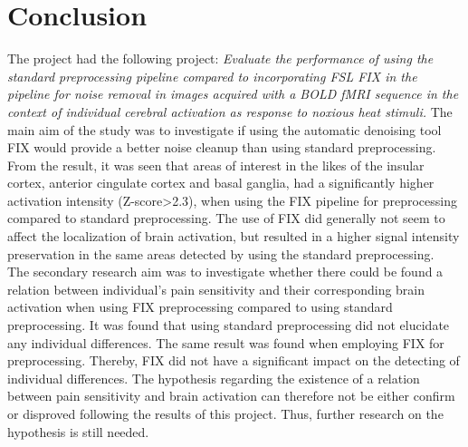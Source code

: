 \chapter{Conclusion}

The project had the following project: \textit{Evaluate the performance of using the standard preprocessing pipeline compared to incorporating FSL FIX in the pipeline for noise removal in images acquired with a BOLD fMRI sequence in the context of individual cerebral activation as response to noxious heat stimuli.} The main aim of the study was to investigate if using the automatic denoising tool FIX would provide a better noise cleanup than using standard preprocessing. From the result, it was seen that areas of interest in the likes of the insular cortex, anterior cingulate cortex and basal ganglia, had a significantly higher activation intensity (Z-score>2.3), when using the FIX pipeline for preprocessing compared to standard preprocessing. The use of FIX did generally not seem to affect the localization of brain activation, but resulted in a higher signal intensity preservation in the same areas detected by using the standard preprocessing. \\
The secondary research aim was to investigate whether there could be found a relation between individual’s pain sensitivity and their corresponding brain activation when using FIX preprocessing compared to using standard preprocessing. It was found that using standard preprocessing did not elucidate any individual differences. The same result was found when employing FIX for preprocessing. Thereby, FIX did not have a significant impact on the detecting of individual differences. The hypothesis regarding the existence of a relation between pain sensitivity and brain activation can therefore not be either confirm or disproved following the results of this project. Thus, further research on the hypothesis is still needed. 